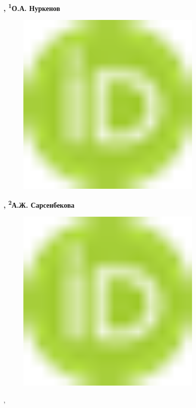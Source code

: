 {\bfseries \textsuperscript{\envelope },
\textsuperscript{1}О.А.
Нуркенов}
\begin{figure}[H]
	\centering
	\includegraphics[width=0.8\textwidth]{media/chem2/image1}
	\caption*{}
\end{figure}
{\bfseries ,
\textsuperscript{2}А.Ж.
Сарсенбекова}
\begin{figure}[H]
	\centering
	\includegraphics[width=0.8\textwidth]{media/chem2/image1}
	\caption*{}
\end{figure}
,

